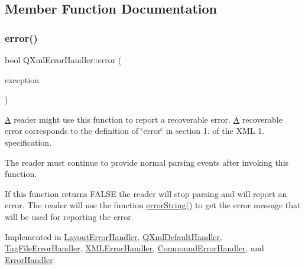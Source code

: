\subsection{Member Function Documentation}
\mbox{\label{class_q_xml_error_handler_aa7e25c4198fa16a0312fd48e5718217c}} 
\subsubsection{\texorpdfstring{error()}{error()}}
{\footnotesize\ttfamily bool Q\+Xml\+Error\+Handler\+::error (\begin{DoxyParamCaption}\item[{const \mbox{\hyperlink{class_q_xml_parse_exception}{Q\+Xml\+Parse\+Exception}} \&}]{exception }\end{DoxyParamCaption})\hspace{0.3cm}{\ttfamily [pure virtual]}}

\mbox{\hyperlink{class_a}{A}} reader might use this function to report a recoverable error. \mbox{\hyperlink{class_a}{A}} recoverable error corresponds to the definition of \char`\"{}error\char`\"{} in section 1. of the X\+ML 1. specification.

The reader must continue to provide normal parsing events after invoking this function.

If this function returns F\+A\+L\+SE the reader will stop parsing and will report an error. The reader will use the function \mbox{\hyperlink{class_q_xml_error_handler_a7b265803d41782e6207b497fe09beff0}{error\+String()}} to get the error message that will be used for reporting the error. 

Implemented in \mbox{\hyperlink{class_layout_error_handler_a7981be5cbf89e7f5bf27b3d75a821726}{Layout\+Error\+Handler}}, \mbox{\hyperlink{class_q_xml_default_handler_a2511bdad8a588353b28292266cf6bdd4}{Q\+Xml\+Default\+Handler}}, \mbox{\hyperlink{class_tag_file_error_handler_ad72696a123207844853784754f3b9a4a}{Tag\+File\+Error\+Handler}}, \mbox{\hyperlink{class_x_m_l_error_handler_a79615a75d1d5e5bf0c3a1c659a1956b9}{X\+M\+L\+Error\+Handler}}, \mbox{\hyperlink{class_compound_error_handler_a6b83c3c1e17622a7f33a977fc8f146c1}{Compound\+Error\+Handler}}, and \mbox{\hyperlink{class_error_handler_a691ab0beb4cd9ba9fbc82b850ad533a3}{Error\+Handler}}.

\mbox{\label{class_q_xml_error_handler_a7b265803d41782e6207b497fe09beff0}} 
